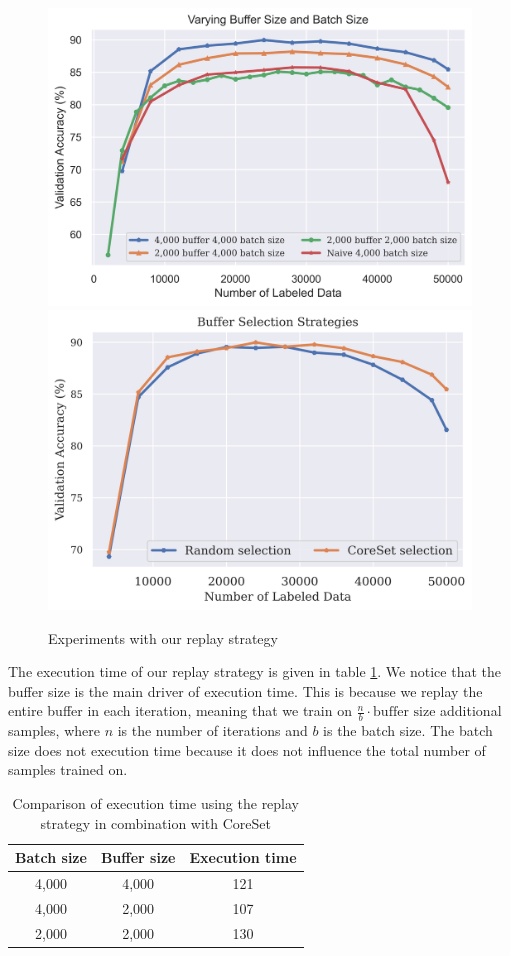 \begin{figure}[h]
    \centering
    \includegraphics[width=0.45\linewidth]{images/results_CAL/replay_varying_batch_size.png} \hfill
    \includegraphics[width=0.45\linewidth]{images/results_CAL/replay_buffer_selection.png}
    \caption{Experiments with our replay strategy}
    \label{fig:Evaluation:CAL:Replay}
\end{figure}

The execution time of our replay strategy is given in table \ref{fig:Evaluation:CAL:Replay_Time}. We notice that the buffer size is the main driver of execution time. This is because
we replay the entire buffer in each iteration, meaning that we train on $\frac{n}{b} \cdot \text{buffer size}$ additional samples, where $n$ is the number of iterations and $b$ is
the batch size. The batch size does not execution time because it does not influence the total number of samples trained on. \par

\begin{table}[h]
    \centering
    \begin{tabular}{c | c  c} 
        Batch size & Buffer size & Execution time\\ 
        \hline 
        4,000 & 4,000 & 121 \\
        4,000 & 2,000 & 107 \\
        2,000 & 2,000 & 130 \\
    \end{tabular}
    \caption{Comparison of execution time using the replay strategy in combination with CoreSet}
    \label{fig:Evaluation:CAL:Replay_Time}
\end{table}


